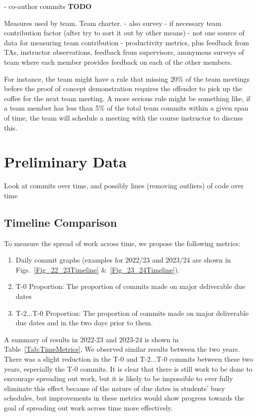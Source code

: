 \documentclass[10pt, conference]{IEEEtran}
\begin{document}
- co-author commits \textbf{TODO}

Measures used by team.  Team charter.  - also survey - if necessary team
contribution factor (after try to sort it out by other means) - not one source
of data for measuring team contribution - productivity metrics, plus feedback
from TAs, instructor observations, feedback from supervisors, anonymous surveys
of team where each member provides feedback on each of the other members.

For instance, the team might have a rule that missing 20\% of the team meetings
before the proof of concept demonstration requires the offender to pick up the
coffee for the next team meeting.  A more serious rule might be something like,
if a team member has less than 5\% of the total team commits within a given span
of time, the team will schedule a meeting with the course instructor to discuss
this.

\section{Preliminary Data} \label{SecPrelimData}

Look at commits over time, and possibly lines (removing outliers) of code over
time

\subsection{Timeline Comparison}

To measure the spread of work across time, we propose the following
metrics:

\begin{enumerate}
\item Daily commit graphs (examples for 2022/23 and 2023/24 are shown in
Figs.~\ref{Fig_22_23Timeline} \&~\ref{Fig_23_24Timeline}).
\item T-0 Proportion: The proportion of commits made on major deliverable due dates
\item T-2$\ldots$T-0 Proportion: The proportion of commits made on major deliverable due
      dates and in the two days prior to them.
\end{enumerate}

A summary of results in 2022-23 and 2023-24 is shown in Table~\ref{Tab:TimeMetrics}.
We observed similar results between the two years. There was a slight reduction in the 
T-0 and T-2...T-0 commits between these two
years, especially the T-0 commits. It is clear that there is still work to be done to
encourage spreading out work, but it is likely to be impossible to ever fully eliminate
this effect because of the nature of due dates in students' busy schedules, but
improvements in these metrics would show progress towards the goal of spreading out
work across time more effectively.
\end{document}
